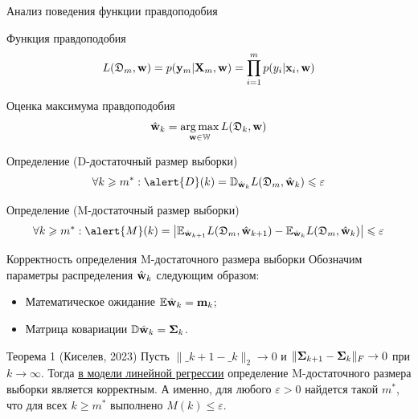 \documentclass{beamer}
\begin{document}
\begin{frame}{Анализ поведения функции правдоподобия}
    \begin{block}{Функция правдоподобия}
        \vspace{-0.3cm}
        \[ L(\mathfrak{D}_m, \mathbf{w}) = p(\mathbf{y}_m | \mathbf{X}_m, \mathbf{w}) = \prod_{i=1}^{m} p(y_i | \mathbf{x}_i, \mathbf{w}) \]
        \vspace{-0.5cm}
    \end{block}
    \begin{block}{Оценка максимума правдоподобия}
        \vspace{-0.2cm}
        \[ \hat{\mathbf{w}}_{k} = \operatorname*{arg\,max}_{\mathbf{w} \in \mathbb{W}} L(\mathfrak{D}_k, \mathbf{w}) \]
        \vspace{-0.5cm}
    \end{block}
    \begin{block}{Определение (\alert{D}-достаточный размер выборки)}
        \vspace{-0.1cm}
        \[ \forall k \geqslant m^*: \alert{D}(k) = \mathbb{D}_{\hat{\mathbf{w}}_{k}} L(\mathfrak{D}_m, \hat{\mathbf{w}}_{k}) \leqslant \varepsilon \]
    \end{block}
    \begin{block}{Определение (\alert{M}-достаточный размер выборки)}
        \vspace{-0.3cm}
        \[ \forall k \geqslant m^*: \alert{M}(k) = \left| \mathbb{E}_{\hat{\mathbf{w}}_{k+1}} L(\mathfrak{D}_m, \hat{\mathbf{w}}_{k+1}) - \mathbb{E}_{\hat{\mathbf{w}}_{k}} L(\mathfrak{D}_m, \hat{\mathbf{w}}_{k}) \right| \leqslant \varepsilon \]
    \end{block}
\end{frame}

\begin{frame}{Корректность определения M-достаточного размера выборки}
    Обозначим параметры распределения $\hat{\mathbf{w}}_k$ следующим образом:
    \begin{itemize}
        \item Математическое ожидание $\mathbb{E} \hat{\mathbf{w}}_k = \mathbf{m}_k$;
        \item Матрица ковариации $\mathbb{D} \hat{\mathbf{w}}_k = \boldsymbol{\Sigma}_k$. 
    \end{itemize}
    \begin{block}{Теорема 1 (Киселев, 2023)}
        Пусть $\| \bm_{k+1} - \bm_k \|_2 \to 0$ и $\| \boldsymbol{\Sigma}_{k+1} - \boldsymbol{\Sigma}_k \|_{F} \to 0$ при $k \to \infty$. Тогда \underline{в модели линейной регрессии} определение M-достаточного размера выборки является корректным. А именно, для любого $\varepsilon > 0$ найдется такой $m^*$, что для всех $k \geqslant m^*$ выполнено $M(k) \leqslant \varepsilon$.
    \end{block}
\end{frame}
\end{document}
